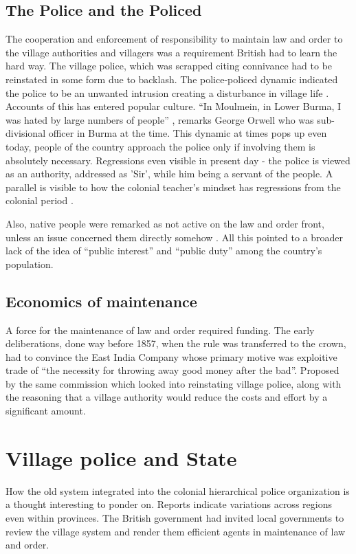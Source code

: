 \documentclass[a4paper]{article}
\begin{document}
\subsection*{The Police and the Policed}
The cooperation and enforcement of responsibility to maintain
law and order to the village authorities and villagers was a
requirement British had to learn the hard way. The village
police, which was scrapped citing connivance had to be
reinstated in some form due to backlash. The police-policed
dynamic indicated the police to be an unwanted intrusion
creating a disturbance in village life \cite[p.
22]{india1913history}. Accounts of this has entered popular
culture. ``In Moulmein, in Lower Burma, I was hated by large
numbers of people'' \cite{orwellshooting}, remarks George Orwell
who was sub-divisional officer in Burma at the time. This
dynamic at times pops up even today, people of the country
approach the police only if involving them is absolutely
necessary. Regressions even visible in present day - the police
is viewed as an authority, addressed as 'Sir', while him being a
servant of the people. A parallel is visible to how the colonial
teacher's mindset has regressions from the colonial period
\cite{kumar2005politics}.

Also, native people were remarked as not active on the law and
order front, unless an issue concerned them directly somehow
\cite[p. 22]{india1913history}. All this pointed to a broader
lack of the idea of ``public interest'' and ``public duty''
among the country's population.

\subsection*{Economics of maintenance}
A force for the maintenance of law and order required funding.
The early deliberations, done way before 1857, when the rule was
transferred to the crown, had to convince the East India
Company whose primary motive was exploitive trade of ``the
necessity for throwing away good money after the bad''. Proposed
by the same commission which looked into reinstating village
police, along with the reasoning that a village authority would
reduce the costs and effort by a significant amount.


\section*{Village police and State}
How the old system integrated into the colonial hierarchical police
organization is a thought interesting to ponder on. Reports
indicate variations across regions even within provinces. The
British government had invited local governments to review the
village system and render them efficient agents in maintenance
of law and order\cite[p. 20]{india1913history}. 
\end{document}
